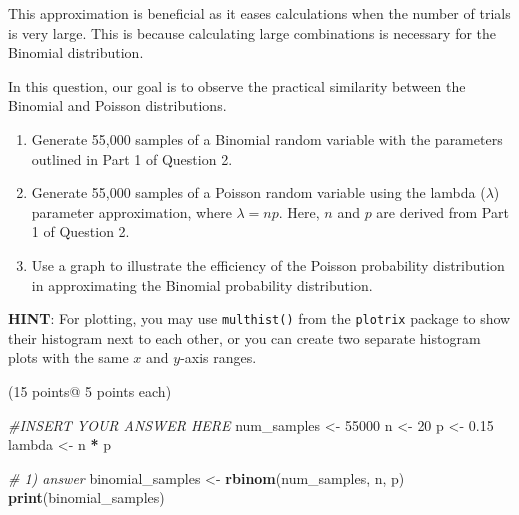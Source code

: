 \documentclass[
]{article}
\newenvironment{Shaded}{\begin{snugshade}}{\end{snugshade}}
\newcommand{\CommentTok}[1]{\textcolor[rgb]{0.56,0.35,0.01}{\textit{#1}}}
\newcommand{\DecValTok}[1]{\textcolor[rgb]{0.00,0.00,0.81}{#1}}
\newcommand{\FloatTok}[1]{\textcolor[rgb]{0.00,0.00,0.81}{#1}}
\newcommand{\FunctionTok}[1]{\textcolor[rgb]{0.13,0.29,0.53}{\textbf{#1}}}
\newcommand{\NormalTok}[1]{#1}
\newcommand{\OtherTok}[1]{\textcolor[rgb]{0.56,0.35,0.01}{#1}}
\newcommand{\SpecialCharTok}[1]{\textcolor[rgb]{0.81,0.36,0.00}{\textbf{#1}}}
\begin{document}
This approximation is beneficial as it eases calculations when the
number of trials is very large. This is because calculating large
combinations is necessary for the Binomial distribution.

In this question, our goal is to observe the practical similarity
between the Binomial and Poisson distributions.

\begin{enumerate}
\def\labelenumi{\arabic{enumi})}
\item
  Generate 55,000 samples of a Binomial random variable with the
  parameters outlined in Part 1 of Question 2.
\item
  Generate 55,000 samples of a Poisson random variable using the lambda
  (\(\lambda\)) parameter approximation, where \(\lambda=np\). Here,
  \(n\) and \(p\) are derived from Part 1 of Question 2.
\item
  Use a graph to illustrate the efficiency of the Poisson probability
  distribution in approximating the Binomial probability distribution.
\end{enumerate}

\textbf{HINT}: For plotting, you may use \texttt{multhist()} from the
\texttt{plotrix} package to show their histogram next to each other, or
you can create two separate histogram plots with the same \(x\) and
\(y\)-axis ranges.

(15 points@ 5 points each)

\begin{Shaded}
\begin{Highlighting}[]
\CommentTok{\#INSERT YOUR ANSWER HERE}
\NormalTok{num\_samples }\OtherTok{\textless{}{-}} \DecValTok{55000}
\NormalTok{n }\OtherTok{\textless{}{-}} \DecValTok{20}
\NormalTok{p }\OtherTok{\textless{}{-}} \FloatTok{0.15}
\NormalTok{lambda }\OtherTok{\textless{}{-}}\NormalTok{ n }\SpecialCharTok{*}\NormalTok{ p}

\CommentTok{\# 1) answer}
\NormalTok{binomial\_samples }\OtherTok{\textless{}{-}} \FunctionTok{rbinom}\NormalTok{(num\_samples, n, p)}
\FunctionTok{print}\NormalTok{(binomial\_samples)}
\end{Highlighting}
\end{Shaded}
\end{document}
